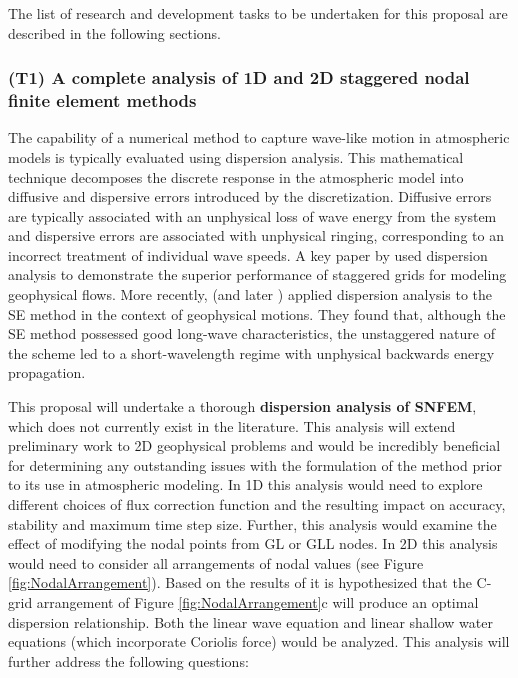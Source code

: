 \documentclass[11pt]{article}
\begin{document}
The list of research and development tasks to be undertaken for this proposal are described in the following sections.

\subsubsection{(T1) A complete analysis of 1D and 2D staggered nodal finite element methods} \label{sec:AnalysisSNFEM}


The capability of a numerical method to capture wave-like motion in atmospheric models is typically evaluated using dispersion analysis.  This mathematical technique decomposes the discrete response in the atmospheric model into diffusive and dispersive errors introduced by the discretization.  Diffusive errors are typically associated with an unphysical loss of wave energy from the system and dispersive errors are associated with unphysical ringing, corresponding to an incorrect treatment of individual wave speeds.  A key paper by \cite{randall1994geostrophic} used dispersion analysis to demonstrate the superior performance of staggered grids for modeling geophysical flows.  More recently, \cite{MAHAW2009SIAMJNA} (and later \cite{TMASJT2012QJRMS}) applied dispersion analysis to the SE method in the context of geophysical motions.  They found that, although the SE method possessed good long-wave characteristics, the unstaggered nature of the scheme led to a short-wavelength regime with unphysical backwards energy propagation.

This proposal will undertake a thorough \textbf{dispersion analysis of SNFEM}, which does not currently exist in the literature.  This analysis will extend preliminary work to 2D geophysical problems and would be incredibly beneficial for determining any outstanding issues with the formulation of the method prior to its use in atmospheric modeling.  In 1D this analysis would need to explore different choices of flux correction function \cite{HTH2007AIAA} and the resulting impact on accuracy, stability and maximum time step size.  Further, this analysis would examine the effect of modifying the nodal points from GL or GLL nodes.  In 2D this analysis would need to consider all arrangements of nodal values (see Figure \ref{fig:NodalArrangement}).  Based on the results of \cite{randall1994geostrophic} it is hypothesized that the C-grid arrangement of Figure \ref{fig:NodalArrangement}c will produce an optimal dispersion relationship.  Both the linear wave equation and linear shallow water equations (which incorporate Coriolis force) would be analyzed.  This analysis will further address the following questions:
\end{document}
